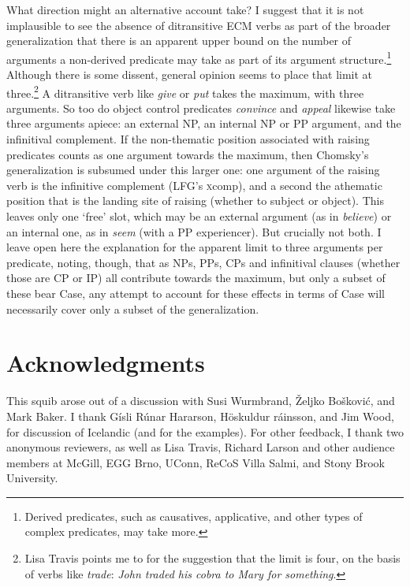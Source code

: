 \documentclass[output=paper]{LSP/langsci}
\begin{document}
What direction might an alternative account take? I suggest that it is not implausible to see the absence of ditransitive ECM verbs as part of the broader generalization that there is an apparent upper bound on the number of arguments a non-derived predicate may take as part of its argument structure.\footnote{Derived predicates, such as causatives, applicative, and other types of complex predicates, may take more.} Although there is some dissent, general opinion seems to place that limit at three.\footnote{Lisa Travis points me to \cite{carter76} for the suggestion that the limit is four, on the basis of verbs like \textit{trade}: \textit{John traded his cobra to Mary for something}.} A ditransitive verb like \textit{give} or \textit{put} takes the maximum, with three arguments. So too do object control predicates \textit{convince} and \textit{appeal} likewise take three arguments apiece: an external NP, an internal NP or PP argument, and the infinitival complement. If the non-thematic position associated with raising predicates counts as one argument towards the maximum, then Chomsky's generalization is subsumed under this larger one: one argument of the raising verb is the infinitive complement (LFG's {\textsc xcomp}), and a second the athematic position that is the landing site of raising (whether to subject or object). This leaves only one `free' slot, which may be an external argument (as in \textit{believe}) or an internal one, as in \textit{seem} (with a PP experiencer). But crucially not both. I leave open here the explanation for the apparent limit to three arguments per predicate, noting, though, that as NPs, PPs, CPs and infinitival clauses (whether those are CP or IP) all contribute towards the maximum, but only a subset of these bear Case, any attempt to account for these effects in terms of Case will necessarily cover only a subset of the generalization. 

\section*{Acknowledgments}

This squib arose out of a discussion with Susi Wurmbrand, \v{Z}eljko Bo\v{s}kovi\'c, and Mark Baker. I thank G\'isli R\'unar Har{\dh}arson, H\"oskuldur {\TH}r\'ainsson, and Jim Wood, for discussion of Icelandic (and for the examples). For other feedback, I thank two anonymous reviewers, as well as Lisa Travis, Richard Larson and other audience members at McGill, EGG Brno, UConn, ReCoS Villa Salmi, and Stony Brook University.

\printbibliography
\end{document}
